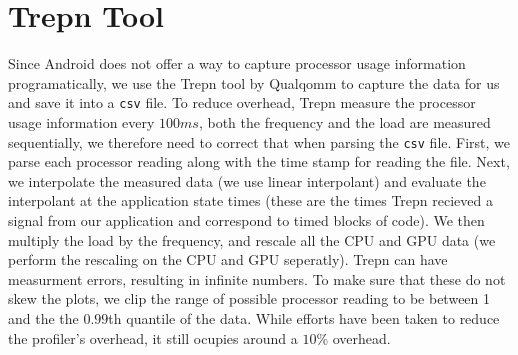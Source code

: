 
\section{Trepn Tool}

Since Android does not offer a way to capture processor usage information
  programatically, we use the Trepn tool by Qualqomm to capture the
  data for us and save it into a {\tt csv} file. 
To reduce overhead, Trepn measure the processor usage information every $100ms$, both
  the frequency and the load are measured sequentially, we therefore need to 
  correct that when parsing the {\tt csv} file.
First, we parse each processor reading along with the time stamp for reading
  the file.
Next, we interpolate the measured data (we use linear interpolant) and
  evaluate the interpolant at the application state times (these are the
  times Trepn recieved a signal from our application and correspond to
  timed blocks of code).
We then multiply the load by the frequency, and rescale all the CPU and GPU data (we perform the rescaling on the CPU and GPU seperatly).
Trepn can have measurment errors, resulting in infinite numbers.
To make sure that these do not skew the plots, we clip the range of possible processor reading to be between 1 and the the $0.99$th quantile of the data.
While efforts have been taken to reduce the profiler's overhead, it still 
  ocupies around a $10\%$ overhead.